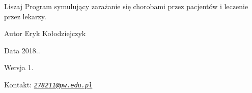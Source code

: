 \begin{DoxyParagraph}{Liszaj}
Program symulujący zarażanie się chorobami przez pacjentów i leczenie przez lekarzy. 
\end{DoxyParagraph}
\begin{DoxyAuthor}{Autor}
Eryk Kołodziejczyk 
\end{DoxyAuthor}
\begin{DoxyDate}{Data}
2018.. 
\end{DoxyDate}
\begin{DoxyVersion}{Wersja}
1. 
\end{DoxyVersion}
\begin{DoxyParagraph}{Kontakt\+:}
{\itshape \href{mailto:278211@pw.edu.pl}{\tt 278211@pw.\+edu.\+pl}} 
\end{DoxyParagraph}
